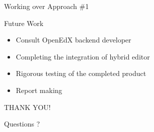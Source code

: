 \documentclass{beamer}
\begin{document}
	\begin{frame}{Working over Approach \#1}
		\begin{block}{Future Work}
			\begin{itemize}
				\item Consult OpenEdX backend developer
				\item Completing the integration of hybrid editor
				\item Rigorous testing of the completed product
				\item Report making
			\end{itemize}
		\end{block}
	\end{frame}
	
	\begin{frame}
		THANK YOU!
	\end{frame}
	
	\begin{frame}
		Questions ?
	\end{frame}
\end{document}
